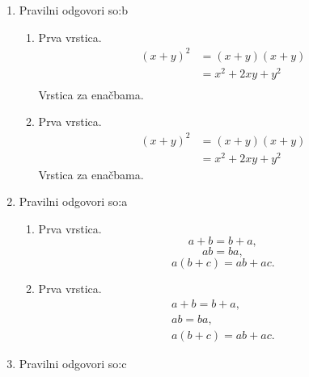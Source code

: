 \documentclass[11pt]{article}
\begin{document}
\begin{enumerate}
    \item Pravilni odgovori so:b %
    \begin{enumerate}
        \item Prva vrstica.
\begin{align*}
  (x + y)^2 &= (x + y)(x + y) \\
  &= x^2 + 2 x y + y^2 \\
\end{align*}
        Vrstica za enačbama.
        \item Prva vrstica.
\begin{align*}
  (x + y)^2 &= (x + y)(x + y) \\
  &= x^2 + 2 x y + y^2
\end{align*}
        Vrstica za enačbama.
    \end{enumerate}

    \item Pravilni odgovori so:a %
    \begin{enumerate}
        \item Prva vrstica.
\[ a + b = b + a, \]
\[ a b = b a, \]
\[ a (b + c) = a b + a c. \]
        \item Prva vrstica.
\begin{gather*}
  a + b = b + a, \\
  a b = b a, \\
  a (b + c) = a b + a c.
\end{gather*}
    \end{enumerate}

    \item Pravilni odgovori so:c %

\end{enumerate}
\end{document}
